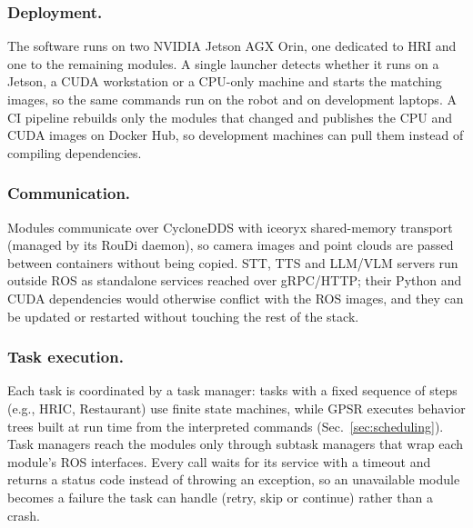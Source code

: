 \subsubsection{Deployment.} The software runs on two NVIDIA Jetson AGX Orin, one dedicated to HRI and one to the remaining modules. A single launcher detects whether it runs on a Jetson, a CUDA workstation or a CPU-only machine and starts the matching images, so the same commands run on the robot and on development laptops. A CI pipeline rebuilds only the modules that changed and publishes the CPU and CUDA images on Docker Hub, so development machines can pull them instead of compiling dependencies.


\subsubsection{Communication.} Modules communicate over CycloneDDS with iceoryx shared-memory transport (managed by its RouDi daemon), so camera images and point clouds are passed between containers without being copied. STT, TTS and LLM/VLM servers run outside ROS as standalone services reached over gRPC/HTTP; their Python and CUDA dependencies would otherwise conflict with the ROS images, and they can be updated or restarted without touching the rest of the stack.


\subsubsection{Task execution.} Each task is coordinated by a task manager: tasks with a fixed sequence of steps (e.g., HRIC, Restaurant) use finite state machines, while GPSR executes behavior trees built at run time from the interpreted commands (Sec.~\ref{sec:scheduling}). Task managers reach the modules only through subtask managers that wrap each module's ROS interfaces. Every call waits for its service with a timeout and returns a status code instead of throwing an exception, so an unavailable module becomes a failure the task can handle (retry, skip or continue) rather than a crash.

